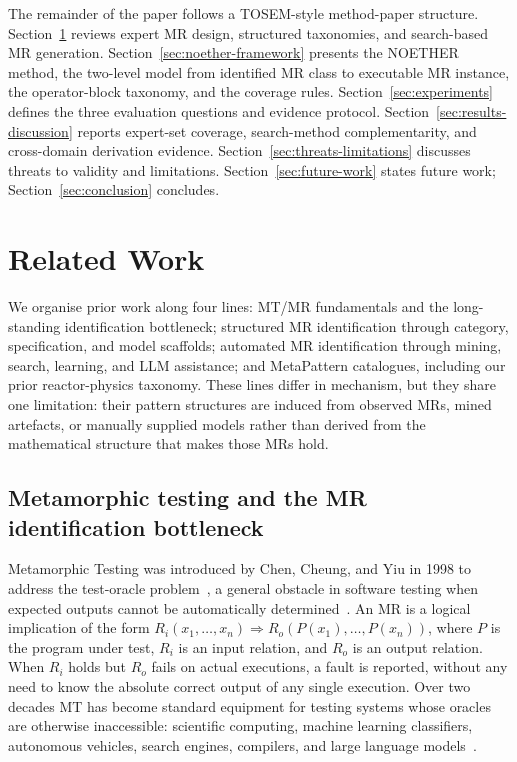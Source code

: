 \documentclass[manuscript]{acmart}
\begin{document}
The remainder of the paper follows a TOSEM-style method-paper structure. Section~\ref{sec:related} reviews expert MR design, structured taxonomies, and search-based MR generation. Section~\ref{sec:noether-framework} presents the NOETHER method, the two-level model from identified MR class to executable MR instance, the operator-block taxonomy, and the coverage rules. Section~\ref{sec:experiments} defines the three evaluation questions and evidence protocol. Section~\ref{sec:results-discussion} reports expert-set coverage, search-method complementarity, and cross-domain derivation evidence. Section~\ref{sec:threats-limitations} discusses threats to validity and limitations. Section~\ref{sec:future-work} states future work; Section~\ref{sec:conclusion} concludes.

\section{Related Work}
\label{sec:related}

We organise prior work along four lines: MT/MR fundamentals and the long-standing identification bottleneck; structured MR identification through category, specification, and model scaffolds; automated MR identification through mining, search, learning, and LLM assistance; and MetaPattern catalogues, including our prior reactor-physics taxonomy. These lines differ in mechanism, but they share one limitation: their pattern structures are induced from observed MRs, mined artefacts, or manually supplied models rather than derived from the mathematical structure that makes those MRs hold.

\subsection{Metamorphic testing and the MR identification bottleneck}

Metamorphic Testing was introduced by Chen, Cheung, and Yiu in 1998 to address the test-oracle problem~\cite{Chen1998}, a general obstacle in software testing when expected outputs cannot be automatically determined~\cite{Barr2015OracleProblem}. An MR is a logical implication of the form $R_i(x_1,\dots,x_n) \Rightarrow R_o(P(x_1),\dots,P(x_n))$, where $P$ is the program under test, $R_i$ is an input relation, and $R_o$ is an output relation. When $R_i$ holds but $R_o$ fails on actual executions, a fault is reported, without any need to know the absolute correct output of any single execution. Over two decades MT has become standard equipment for testing systems whose oracles are otherwise inaccessible: scientific computing, machine learning classifiers, autonomous vehicles, search engines, compilers, and large language models~\cite{Segura2016, LiTOSEM2025}.
\end{document}
